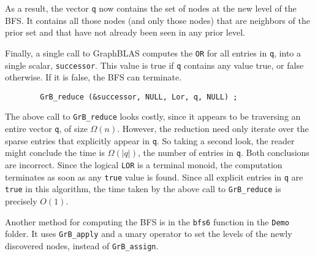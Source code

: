 \documentclass[12pt]{article}
\begin{document}
As a result, the vector \verb'q' now contains the set of nodes at the new
level of the BFS.  It contains all those nodes (and only those nodes)
that are neighbors of the prior set and that have not already been seen in
any prior level.

Finally, a single call to GraphBLAS computes the \verb'OR' for all entries
in \verb'q', into a single scalar, \verb'successor'.  This value is true if
\verb'q' contains any value true, or false otherwise.  If it is false,
the BFS can terminate.

        {\footnotesize
        \begin{verbatim}
        GrB_reduce (&successor, NULL, Lor, q, NULL) ; \end{verbatim}}

The above call to \verb'GrB_reduce' looks costly, since it appears to be
traversing an entire vector \verb'q', of size $\Omega(n)$.  However, the
reduction need only iterate over the sparse entries that explicitly appear in
\verb'q'.  So taking a second look, the reader might conclude the time is
$\Omega(|q|)$, the number of entries in \verb'q'.  Both conclusions are
incorrect.  Since the logical \verb'LOR' is a terminal monoid, the computation
terminates as soon as any \verb'true' value is found.  Since all explicit
entries in \verb'q' are \verb'true' in this algorithm, the time taken by the
above call to \verb'GrB_reduce' is precisely $O(1)$.

Another method for computing the BFS is in the \verb'bfs6' function in the
\verb'Demo' folder.  It uses \verb'GrB_apply' and a unary operator to set the
levels of the newly discovered nodes, instead of
\verb'GrB_assign'.
\end{document}
